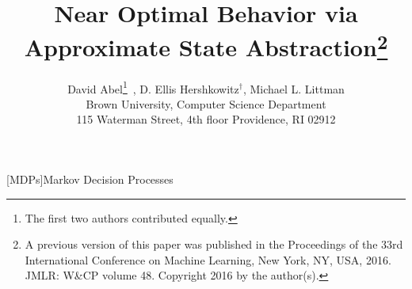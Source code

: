 \documentclass{article}
\begin{document}
\title{\Large{\bf Near Optimal Behavior via Approximate State Abstraction}\footnote{A previous version of this paper was published in the Proceedings of the 33rd International Conference on Machine Learning, New York, NY, USA, 2016. JMLR: W\&CP volume 48. Copyright 2016 by the author(s).}}
\date{}
\author{David Abel\footnote{The first two authors contributed equally.}\ , D. Ellis Hershkowitz$^\dagger$, Michael L. Littman\\
Brown University, Computer Science Department\\
115 Waterman Street, 4th floor
Providence, RI 02912
}

\maketitle



\begin{acronym}
[MDPs]{Markov Decision Processes}
\end{acronym}

\begin{abstract}

\end{abstract}






\end{document}
